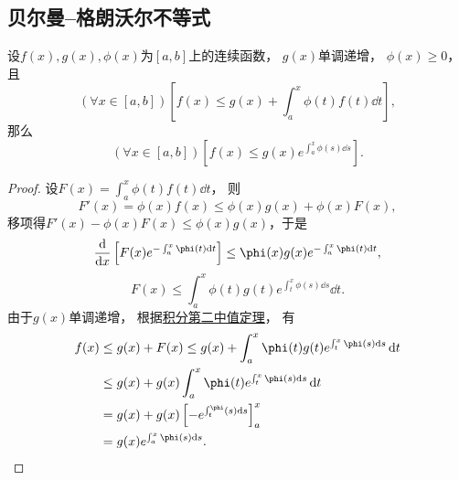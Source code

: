 \subsection{贝尔曼--格朗沃尔不等式}
\begin{theorem}\label{theorem:定积分.贝尔曼--格朗沃尔不等式}
设\(f(x),g(x),\phi(x)\)为\([a,b]\)上的连续函数，
\(g(x)\)单调递增，
\(\phi(x)\geq0\)，
且\[
	(\forall x \in [a,b])
	\left[
		f(x) \leq g(x) + \int_a^x \phi(t) f(t) \dd{t}
	\right],
\]
那么\[
	(\forall x \in [a,b])
	\left[
		f(x) \leq g(x) e^{\int_a^x \phi(s) \dd{s}}
	\right].
\]
\begin{proof}
设\(F(x) = \int_a^x \phi(t) f(t) \dd{t}\)，
则\[
	F'(x) = \phi(x) f(x) \leq \phi(x) g(x) + \phi(x) F(x),
\]
移项得\(F'(x) - \phi(x) F(x) \leq \phi(x) g(x)\)，于是\[
	\dv{x}\left[F(x) e^{-\int_a^x \phi(t) \dd{t}}\right]
	\leq \phi(x) g(x) e^{-\int_a^x \phi(t) \dd{t}},
\]\[
	F(x) \leq \int_a^x \phi(t) g(t) e^{\int_t^x \phi(s) \dd{s}} \dd{t}.
\]
由于\(g(x)\)单调递增，
根据\hyperref[theorem:定积分.积分中值定理2]{积分第二中值定理}，
有\begin{align*}
	f(x) &\leq g(x) + F(x)
		\leq g(x) + \int_a^x \phi(t) g(t) e^{\int_t^x \phi(s) \dd{s}} \dd{t} \\
	&\leq g(x) + g(x) \int_a^x \phi(t) e^{\int_t^x \phi(s) \dd{s}} \dd{t} \\
	&= g(x) + g(x) \left[-e^{\int_t^ \phi(s) \dd{s}}\right]_a^x \\
	&= g(x) e^{\int_a^x \phi(s) \dd{s}}.
	\qedhere
\end{align*}
\end{proof}
\end{theorem}
